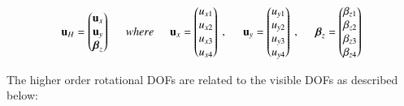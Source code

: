 \begin{equation} 
\mathbf{u}_H = 
\begin{pmatrix}
\mathbf{u}_x \\ 
\mathbf{u}_y \\
\boldsymbol{\beta}_z
\end{pmatrix} 
\hspace{5mm}
where
\hspace{5mm}
\mathbf{u}_x = 
\begin{pmatrix}
u_{x1} \\
u_{x2} \\
u_{x3} \\
u_{x4} 
\end{pmatrix}
\ ,\hspace{5mm}
\mathbf{u}_y = 
\begin{pmatrix}
u_{y1} \\
u_{y2} \\
u_{y3} \\
u_{y4} 
\end{pmatrix}
\ ,\hspace{5mm}
\boldsymbol{\beta}_z= 
\begin{pmatrix}
\beta_{z1} \\
\beta_{z2}  \\
\beta_{z3}  \\
\beta_{z4} 
\end{pmatrix}
\label{equation07_2}
\end{equation}

The higher order rotational DOFs are related to the visible DOFs as described below:

